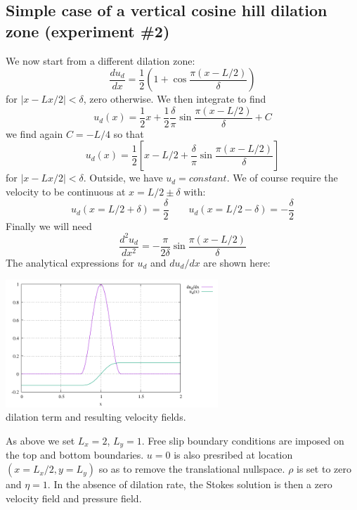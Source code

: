 \subsection*{Simple case of a vertical cosine hill dilation zone (experiment \#2)}

We now start from a different dilation zone:
\[
\frac{d u_d}{d x} = \frac12 (1+\cos\frac{ \pi (x-L/2)}{\delta})
\]
for $|x-Lx/2|<\delta$, zero otherwise.
We then integrate to find
\[
u_d(x) = \frac12x + \frac12\frac{\delta }{\pi  }\sin  \frac{ \pi (x-L/2)}{\delta} +C
\]
we find again $C=-L/4$
so that 
\[
u_d(x) = \frac12 \left[ x-L/2 + \frac{\delta }{\pi  }\sin  \frac{ \pi (x-L/2)}{\delta} \right]
\]
for $|x-Lx/2|<\delta$. Outside, we have
$u_d=constant$. We of course require the velocity to be continuous at 
$x=L/2\pm \delta$ with:
\[
u_d(x=L/2+\delta) = \frac{\delta }{2} 
\qquad
u_d(x=L/2-\delta) = -\frac{\delta }{2} 
\]
Finally we will need
\[
\frac{d^2 u_d}{d x^2} = -\frac{\pi}{2\delta}  \sin \frac{ \pi (x-L/2)}{\delta}
\]
The analytical expressions for $u_d$ and $du_d/dx$ are shown here:
\begin{center}
\includegraphics[width=8cm]{python_codes/fieldstone_175/results/exp2/analytical.pdf}\\
{\captionfont dilation term and resulting velocity fields.}
\end{center}

As above we set $L_x=2$, $L_y=1$. Free slip boundary conditions are imposed on the 
top and bottom boundaries. $u=0$ is also presribed at location $(x=L_x/2,y=L_y)$
so as to remove the translational nullspace. $\rho$ is set to zero and $\eta=1$. 
In the absence of dilation rate, the Stokes solution is then a zero velocity field and pressure field.


